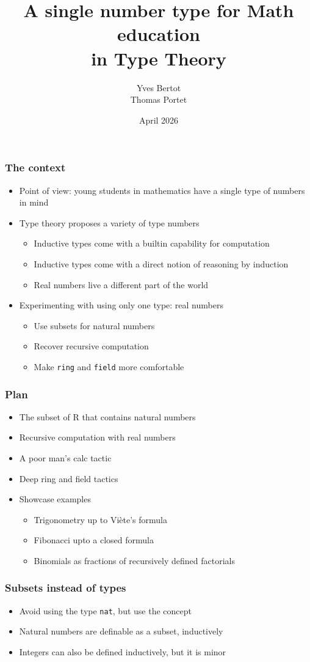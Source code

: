 \documentclass[compress]{beamer}
\title{A single number type for Math education\\in Type Theory}
\author{Yves Bertot\\Thomas Portet}
\date{April 2026}
\begin{document}
\maketitle
\begin{frame}
\frametitle{The context}
\begin{itemize}
\item Point of view: young students in mathematics have a single type of numbers in mind
\item Type theory proposes a variety of type numbers
\begin{itemize}
\item Inductive types come with a builtin capability for computation
\item Inductive types come with a direct notion of reasoning by induction
\item Real numbers live a different part of the world
\end{itemize}
\item Experimenting with using only one type: real numbers
\begin{itemize}
\item Use subsets for natural numbers
\item Recover recursive computation
\item Make {\tt ring} and {\tt field} more comfortable
\end{itemize}
\end{itemize}
\end{frame}
\begin{frame}
\frametitle{Plan}
\begin{itemize}
\item The subset of R that contains natural numbers
\item Recursive computation with real numbers
\item A poor man's calc tactic
\item Deep ring and field tactics
\item Showcase examples
\begin{itemize}
\item Trigonometry up to Viète's formula
\item Fibonacci upto a closed formula
\item Binomials as fractions of recursively defined factorials
\end{itemize}
\end{itemize}
\end{frame}
\begin{frame}
\frametitle{Subsets instead of types}
\begin{itemize}
\item Avoid using the type {\tt nat}, but use the concept
\item Natural numbers are definable as a subset, inductively
\item Integers can also be defined inductively, but it is minor
\end{itemize}
\end{frame}
\end{document}
